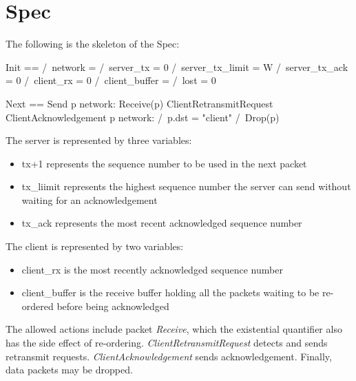 \section{Spec}

The following is the skeleton of the Spec: 
\newline

\begin{tla}
Init ==
    /\ network = {}
    /\ server_tx = 0
    /\ server_tx_limit = W
    /\ server_tx_ack = 0
    /\ client_rx = 0
    /\ client_buffer = {} 
    /\ lost = 0

Next == 
    \/ Send 
    \/ \E p \in network: 
        Receive(p)
    \/ ClientRetransmitRequest
    \/ ClientAcknowledgement
    \/ \E p \in network: 
        /\ p.dst = "client" 
        /\ Drop(p)
\end{tla}
\begin{tlatex}
%
%
%
%
%
%
%
%
\@pvspace{8.0pt}%
%
%
%
%
%
%
%
%
%
\end{tlatex}
\newline

The server is represented by three variables: 
\begin{itemize}
    \item tx+1 represents the sequence number to be used in the next packet
    \item tx\_liimit represents the highest sequence number the server can send
    without waiting for an acknowledgement
    \item tx\_ack represents the most recent acknowledged sequence number
\end{itemize}

The client is represented by two variables: 
\begin{itemize}
    \item client\_rx is the most recently acknowledged sequence number
    \item client\_buffer is the receive buffer holding all the packets waiting 
    to be re-ordered before being acknowledged\end{itemize}
The allowed actions include packet \textit{Receive}, which the existential
quantifier also has the side effect of re-ordering.
\textit{ClientRetransmitRequest} detects and sends retransmit requests.
\textit{ClientAcknowledgement} sends acknowledgement. Finally, data packets may
be dropped.\newline

